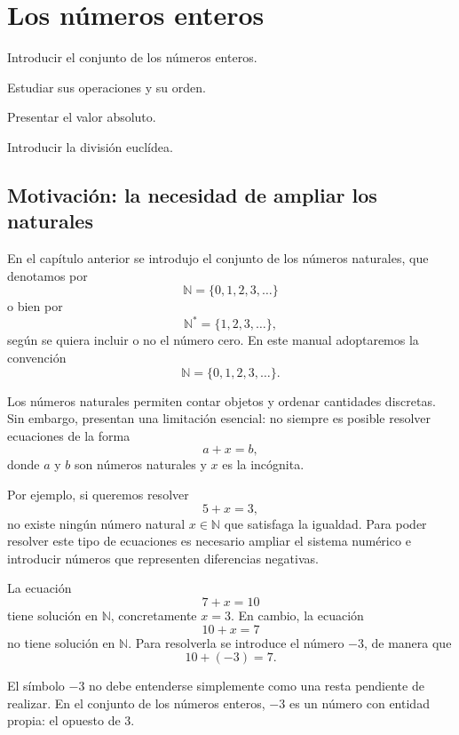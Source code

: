 
\chapter{Los números enteros}

\begin{objetivos}
  \item Introducir el conjunto de los números enteros.
  \item Estudiar sus operaciones y su orden.
  \item Presentar el valor absoluto.
  \item Introducir la división euclídea.
\end{objetivos}

\section{Motivación: la necesidad de ampliar los naturales}

En el capítulo anterior se introdujo el conjunto de los números naturales, que denotamos por
\[
  \mathbb{N}=\{0,1,2,3,\ldots\}
\]
o bien por
\[
  \mathbb{N}^{*}=\{1,2,3,\ldots\},
\]
según se quiera incluir o no el número cero. En este manual adoptaremos la convención
\[
  \mathbb{N}=\{0,1,2,3,\ldots\}.
\]

Los números naturales permiten contar objetos y ordenar cantidades discretas. Sin embargo, presentan una limitación esencial: no siempre es posible resolver ecuaciones de la forma
\[
  a+x=b,
\]
donde \(a\) y \(b\) son números naturales y \(x\) es la incógnita.

Por ejemplo, si queremos resolver
\[
  5+x=3,
\]
no existe ningún número natural \(x\in\mathbb{N}\) que satisfaga la igualdad. Para poder resolver este tipo de ecuaciones es necesario ampliar el sistema numérico e introducir números que representen diferencias negativas.

\begin{ejemplo}
La ecuación
\[
  7+x=10
\]
tiene solución en \(\mathbb{N}\), concretamente \(x=3\). En cambio, la ecuación
\[
  10+x=7
\]
no tiene solución en \(\mathbb{N}\). Para resolverla se introduce el número \(-3\), de manera que
\[
  10+(-3)=7.
\]
\end{ejemplo}

\begin{advertencia}
El símbolo \(-3\) no debe entenderse simplemente como una resta pendiente de realizar. En el conjunto de los números enteros, \(-3\) es un número con entidad propia: el opuesto de \(3\).
\end{advertencia}

